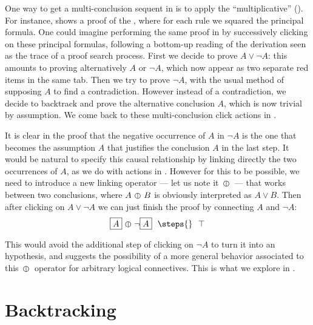 One way to get a multi-conclusion sequent in  is to apply the
``multiplicative''  {} ().
For instance,  shows a proof of the ,
where for each rule we squared the principal formula.
One could imagine performing the same proof in  by successively clicking
on these principal formulas, following a bottom-up reading of the  derivation seen as the trace of a proof search process. First we decide
to prove $A \lor \neg A$: this amounts to proving alternatively $A$ or $\neg
A$, which now appear as two separate red items in the same tab. Then we try to
prove $\neg A$, with the usual method of supposing $A$ to find a contradiction.
However instead of a contradiction, we decide to backtrack and prove the
alternative conclusion $A$, which is now trivial by assumption. We come back to
these multi-conclusion click actions in .

It is clear in the proof that the negative occurrence of $A$ in $\neg A$ is the
one that becomes the assumption $A$ that justifies the conclusion $A$ in the
last step. It would be natural to specify this causal relationship by linking
directly the two occurrences of $A$, as we do with  actions in .
However for this to be possible, we need to introduce a new linking operator ---
let us note it $\operatorname{\,\varobar\,}$ --- that works between two conclusions, where $A \operatorname{\,\varobar\,} B$
is obviously interpreted as $A \lor B$. Then after clicking on $A \lor \neg A$
we can just finish the proof by connecting $A$ and $\neg A$:
$$\select{A} \para \neg \select{A} ~~\steps{}~~ \top$$

This would avoid the additional step of clicking on $\neg A$ to turn it into an
hypothesis, and suggests the possibility of a more general behavior
associated to this $\operatorname{\,\varobar\,}$ operator for arbitrary logical connectives. This is
what we explore in .

\section{Backtracking}


